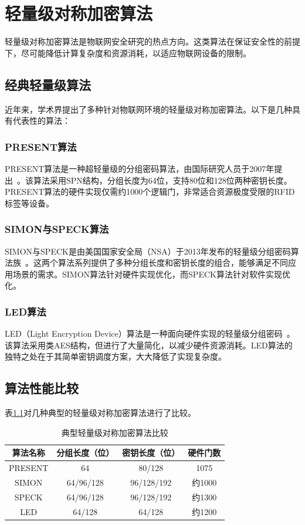\chapter{轻量级对称加密算法}

轻量级对称加密算法是物联网安全研究的热点方向。这类算法在保证安全性的前提下，尽可能降低计算复杂度和资源消耗，以适应物联网设备的限制。

\section{经典轻量级算法}

近年来，学术界提出了多种针对物联网环境的轻量级对称加密算法。以下是几种具有代表性的算法：

\subsection{PRESENT算法}

PRESENT算法是一种超轻量级的分组密码算法，由国际研究人员于2007年提出~\cite{bogdanov2008present}。该算法采用SPN结构，分组长度为64位，支持80位和128位两种密钥长度。PRESENT算法的硬件实现仅需约1000个逻辑门，非常适合资源极度受限的RFID标签等设备。

\subsection{SIMON与SPECK算法}

SIMON与SPECK是由美国国家安全局（NSA）于2013年发布的轻量级分组密码算法族~\cite{beaulieu2015simon}。这两个算法系列提供了多种分组长度和密钥长度的组合，能够满足不同应用场景的需求。SIMON算法针对硬件实现优化，而SPECK算法针对软件实现优化。

\subsection{LED算法}

LED（Light Encryption Device）算法是一种面向硬件实现的轻量级分组密码~\cite{guo2011led}。该算法采用类AES结构，但进行了大量简化，以减少硬件资源消耗。LED算法的独特之处在于其简单密钥调度方案，大大降低了实现复杂度。

\section{算法性能比较}

表\ref{tab:algorithm_compare}对几种典型的轻量级对称加密算法进行了比较。

\begin{table}[htbp]
\centering
\caption{典型轻量级对称加密算法比较}
\label{tab:algorithm_compare}
\begin{tabular}{cccc}
\toprule
算法名称 & 分组长度（位） & 密钥长度（位） & 硬件门数 \\
\midrule
PRESENT & 64 & 80/128 & 1075 \\
SIMON & 64/96/128 & 96/128/192 & 约1000 \\
SPECK & 64/96/128 & 96/128/192 & 约1300 \\
LED & 64/128 & 64/128 & 约1200 \\
\bottomrule
\end{tabular}
\end{table}

